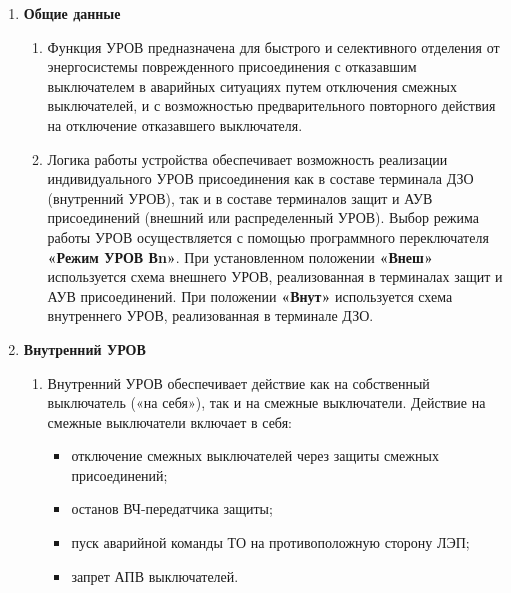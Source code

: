 \begin{enumerate}

\item \textbf{Общие данные}

\begin{enumerate}

\item
Функция УРОВ предназначена для быстрого и селективного отделения от энергосистемы поврежденного присоединения с отказавшим выключателем в аварийных ситуациях путем отключения смежных выключателей, и с возможностью предварительного повторного действия на отключение отказавшего выключателя.

\item
Логика работы устройства обеспечивает возможность реализации индивидуального УРОВ присоединения как в составе терминала ДЗО (внутренний УРОВ), так и в составе терминалов защит и АУВ присоединений (внешний или распределенный УРОВ). Выбор режима работы УРОВ осуществляется с помощью программного переключателя \textbf{«Режим УРОВ Вn»}. При установленном положении \textbf{«Внеш»} используется схема внешнего УРОВ, реализованная в терминалах защит и АУВ присоединений. При положении \textbf{«Внут»} используется схема внутреннего УРОВ, реализованная в терминале ДЗО.

\end {enumerate}


\item \textbf{Внутренний УРОВ}

\begin{enumerate}

\item
Внутренний УРОВ обеспечивает действие как на собственный выключатель («на себя»), так и на смежные выключатели. Действие на смежные выключатели включает в себя:
\begin{itemize}
\item отключение смежных выключателей через защиты смежных присоединений;
\item останов ВЧ-передатчика защиты;
\item пуск аварийной команды ТО на противоположную сторону ЛЭП;
\item запрет АПВ выключателей.
\end{itemize}


\end{enumerate}
\end{enumerate}
